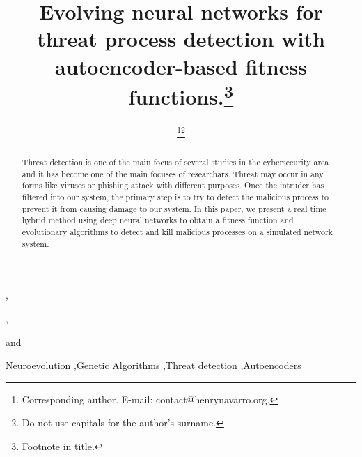 \documentclass{iosart2c}
\begin{document}
\begin{frontmatter}                           %

%
\title{Evolving neural networks for threat process detection with autoencoder-based fitness functions.\thanks{Footnote in title.}}



\author[A]{ \thanks{Corresponding author. E-mail: contact@henrynavarro.org.}\thanks{Do not use capitals for the author's surname.}},
\author[B]{ },
\author[B]{ }
and
\author[B]{ }
\address[A]{Research and Development Lab, Vision Analytics, Avenida de Europa 19, 28224, Pozuelo de Alarcón, Madrid,\\ Spain\\
E-mail: contact@henrynavarro.org}
\address[B]{Research and Development Labs, Capgemini Engineering, Calle Campezo, 1, 28022, Madrid, Spain.\\
E-mail: engineering@capgemini.com}

\begin{abstract}
Threat detection is one of the main focus of several studies in the cybersecurity area and it has become one of the main focuses of researchars. Threat may occur in any forms like viruses or phishing attack with different purposes. Once the intruder has filtered into our system, the primary step is to try to detect the malicious process to prevent it from causing damage to our system. In this paper, we present a real time hybrid method using deep neural networks to obtain a fitness function and evolutionary algorithms to detect and kill malicious processes on a simulated network system.
\end{abstract}

\begin{keyword}
Neuroevolution \sep Genetic Algorithms \sep Threat detection \sep Autoencoders
\end{keyword}

\end{frontmatter}
\end{document}

